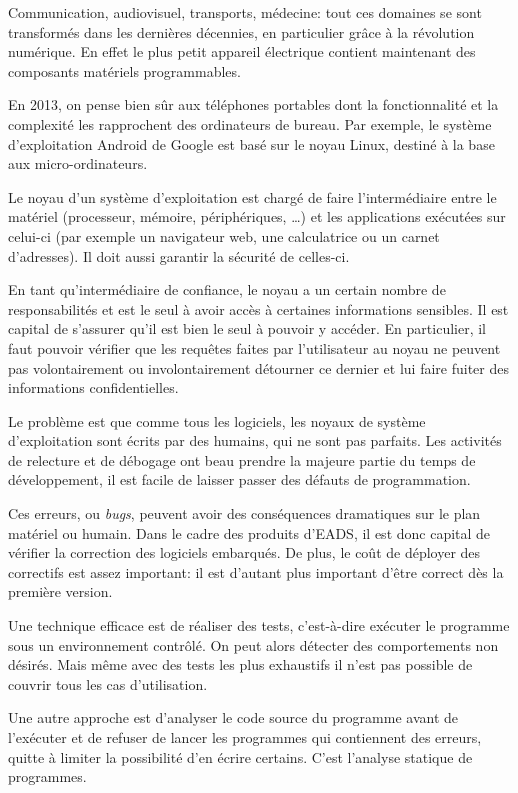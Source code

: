 Communication,
audiovisuel,
transports,
médecine:
tout ces domaines se sont transformés dans les dernières décennies,
en particulier grâce à la révolution numérique.
En effet le plus petit appareil électrique contient maintenant des composants
matériels programmables.

En 2013, on pense bien sûr aux téléphones portables dont la fonctionnalité et la
complexité les rapprochent des ordinateurs de bureau. Par exemple, le système
d'exploitation Android de Google est basé sur le noyau Linux, destiné à la base
aux micro-ordinateurs.

Le noyau d'un système d'exploitation est chargé de faire l'intermédiaire entre
le matériel (processeur, mémoire, périphériques, …) et les applications
exécutées sur celui-ci (par exemple un navigateur web, une calculatrice ou un
carnet d'adresses). Il doit aussi garantir la sécurité de celles-ci. %

En tant qu'intermédiaire de confiance, le noyau a un certain nombre de
responsabilités et est le seul à avoir accès à certaines informations sensibles.
Il est capital de s'assurer qu'il est bien le seul à pouvoir y accéder. En
particulier, il faut pouvoir vérifier que les requêtes faites par l'utilisateur
au noyau ne peuvent pas volontairement ou involontairement détourner ce dernier
et lui faire fuiter des informations confidentielles.

Le problème est que comme tous les logiciels, les noyaux de système
d'exploitation sont écrits par des humains, qui ne sont pas parfaits. Les
activités de relecture et de débogage ont beau prendre la majeure partie du
temps de développement, il est facile de laisser passer des défauts de
programmation.

Ces erreurs, ou \emph{bugs}, peuvent avoir des conséquences dramatiques sur le
plan matériel ou humain. Dans le cadre des produits d'EADS, il est donc capital
de vérifier la correction des logiciels embarqués. De plus, le coût de déployer
des correctifs est assez important: il est d'autant plus important d'être
correct dès la première version.

Une technique efficace est de réaliser des tests, c'est-à-dire exécuter le
programme sous un environnement contrôlé. On peut alors détecter des
comportements non désirés. Mais même avec des tests les plus exhaustifs il n'est
pas possible de couvrir tous les cas d'utilisation.

Une autre approche est d'analyser le code source du programme avant de
l'exécuter et de refuser de lancer les programmes qui contiennent des erreurs,
quitte à limiter la possibilité d'en écrire certains. C'est l'analyse statique
de programmes.

